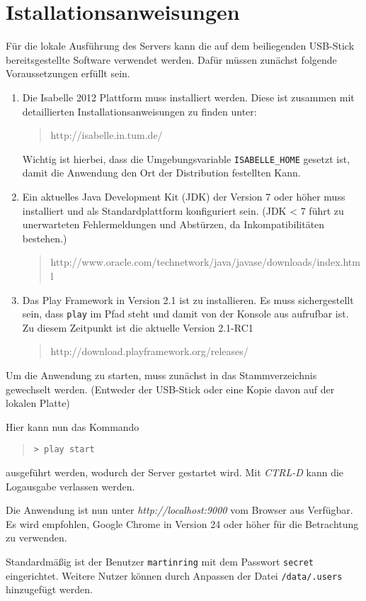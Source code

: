 \chapter{Istallationsanweisungen}
\label{sec:install}

Für die lokale Ausführung des Servers kann die auf dem beiliegenden USB-Stick bereitsgestellte
Software verwendet werden. Dafür müssen zunächst folgende Voraussetzungen erfüllt sein.

\begin{enumerate}
  \item Die Isabelle 2012 Plattform muss installiert werden. Diese ist zusammen mit detaillierten 
  Installationsanweisungen zu finden unter:
  \begin{quote}
  http://isabelle.in.tum.de/
  \end{quote}
  Wichtig ist hierbei, dass die Umgebungsvariable \texttt{ISABELLE\_HOME} gesetzt ist, damit die 
  Anwendung den Ort der Distribution festellten Kann.
  \item Ein aktuelles Java Development Kit (JDK) der Version 7 oder höher muss installiert und als 
  Standardplattform konfiguriert sein. (JDK < 7 führt zu unerwarteten Fehlermeldungen und Abstürzen, 
  da Inkompatibilitäten bestehen.)
  \begin{quote}
  http://www.oracle.com/technetwork/java/javase/downloads/index.html
  \end{quote}
  \item Das Play Framework in Version 2.1 ist zu installieren. Es muss sichergestellt sein, dass
  \texttt{play} im Pfad steht und damit von der Konsole aus aufrufbar ist. Zu diesem Zeitpunkt ist
  die aktuelle Version 2.1-RC1
  \begin{quote}
  http://download.playframework.org/releases/
  \end{quote}
\end{enumerate}

Um die Anwendung zu starten, muss zunächst in das Stammverzeichnis gewechselt werden. (Entweder der
USB-Stick oder eine Kopie davon auf der lokalen Platte)

Hier kann nun das Kommando

\begin{quote}
\texttt{> play start}
\end{quote}

ausgeführt werden, wodurch der Server gestartet wird. Mit \textit{CTRL-D} kann die Logausgabe
verlassen werden.

Die Anwendung ist nun unter \textit{http://localhost:9000} vom Browser aus Verfügbar. Es wird
empfohlen, Google Chrome in Version 24 oder höher für die Betrachtung zu verwenden.

Standardmäßig ist der Benutzer \texttt{martinring} mit dem Passwort \texttt{secret} eingerichtet.
Weitere Nutzer können durch Anpassen der Datei \texttt{/data/.users} hinzugefügt werden.